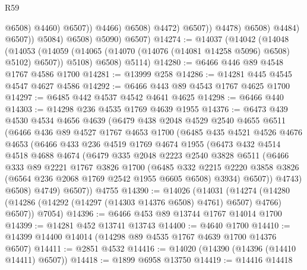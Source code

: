 \begin{lexlean}{R59}
\begin{coremodule}
                                        @6508)
                                      @4460)
                                    @6507))
                                @4466)
                              @6508)
                            @4472)
                          @6507))
                      @4478)
                    @6508)
                  @4484)
                @6507))
            @5084)
          @6508)
        @5090)
      @6507)
@14274 := @14037
    (@14042
      (@14048
        (@14053 (@14059 (@14065 (@14070 (@14076 (@14081 @14258 @5096) @6508) @5102) @6507)) @5108)
        @6508)
      @5114)
@14280 := @6466 @446 @89 @4548 @1767 @4586 @1700
@14281 := @13999 @258
@14286 := @14281 @445 @4545 @4547 @4627 @4586
@14292 := @6466 @443 @89 @4543 @1767 @4625 @1700
@14297 := @6485 @442 @4537 @4542 @4641 @4625
@14298 := @6466 @440
@14303 := @14298 @236 @4535 @1769 @4639 @1955
@14376 := @6473
    @439
    @4530
    @4534
    @4656
    @4639
    (@6479
      @438
      @2048
      @4529
      @2540
      @4655
      @6511
      (@6466
        @436
        @89
        @4527
        @1767
        @4653
        @1700
        (@6485
          @435
          @4521
          @4526
          @4676
          @4653
          (@6466
            @433
            @236
            @4519
            @1769
            @4674
            @1955
            (@6473
              @432
              @4514
              @4518
              @4688
              @4674
              (@6479
                @335
                @2048
                @2223
                @2540
                @3828
                @6511
                (@6466
                  @333
                  @89
                  @2221
                  @1767
                  @3826
                  @1700
                  (@6485
                    @332
                    @2215
                    @2220
                    @3858
                    @3826
                    (@6564 @236 @2068 @1769 @2542 @1955 @6605 @6508)
                    @3934)
                  @6507))
              @4743)
            @6508)
          @4749)
        @6507))
    @4755
@14390 := @14026
    (@14031
      (@14274 (@14280 (@14286 (@14292 (@14297 (@14303 @14376 @6508) @4761) @6507) @4766) @6507))
      @7054)
@14396 := @6466 @453 @89 @13744 @1767 @14014 @1700
@14399 := @14281 @452 @13741 @13743
@14400 := @4640 @1700
@14410 := @14399 @14400 @14014 (@14298 @89 @4535 @1767 @4639 @1700 @14376 @6507)
@14411 := @2851 @4532
@14416 := @14020 (@14390 (@14396 (@14410 @14411) @6507))
@14418 := @1899 @6958 @13750
@14419 := @14416 @14418

\end{coremodule}
\end{lexlean}
